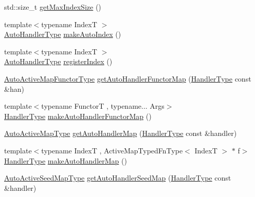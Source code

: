 \begin{DoxyCompactItemize}
\item 
std\+::size\+\_\+t \hyperlink{namespacevt_1_1auto__registry_a590741e9077c758629426d70ea37f4bf}{get\+Max\+Index\+Size} ()
\item 
{\footnotesize template$<$typename IndexT $>$ }\\\hyperlink{namespacevt_1_1auto__registry_ae295e18699146815bb7d7674594d95d7}{Auto\+Handler\+Type} \hyperlink{namespacevt_1_1auto__registry_a14e79eb6744c7f1584d46304356295e2}{make\+Auto\+Index} ()
\item 
{\footnotesize template$<$typename IndexT $>$ }\\\hyperlink{namespacevt_1_1auto__registry_ae295e18699146815bb7d7674594d95d7}{Auto\+Handler\+Type} \hyperlink{namespacevt_1_1auto__registry_a234dcadb35d20ff9a4d0e2464680aa36}{register\+Index} ()
\item 
\hyperlink{namespacevt_1_1auto__registry_ab095554f67e143f84fe337bd85affde5}{Auto\+Active\+Map\+Functor\+Type} \hyperlink{namespacevt_1_1auto__registry_a953643675f2bd525b99c0702753b1367}{get\+Auto\+Handler\+Functor\+Map} (\hyperlink{namespacevt_af64846b57dfcaf104da3ef6967917573}{Handler\+Type} const \&han)
\item 
{\footnotesize template$<$typename FunctorT , typename... Args$>$ }\\\hyperlink{namespacevt_af64846b57dfcaf104da3ef6967917573}{Handler\+Type} \hyperlink{namespacevt_1_1auto__registry_a64989cf40ed8fc5266f9eb67607f4842}{make\+Auto\+Handler\+Functor\+Map} ()
\item 
\hyperlink{namespacevt_1_1auto__registry_a03898a246ff1a8ce8ee4071a0391b386}{Auto\+Active\+Map\+Type} \hyperlink{namespacevt_1_1auto__registry_a5506d0d3d541558f304cc62fbd36c7ce}{get\+Auto\+Handler\+Map} (\hyperlink{namespacevt_af64846b57dfcaf104da3ef6967917573}{Handler\+Type} const \&handler)
\item 
{\footnotesize template$<$typename IndexT , Active\+Map\+Typed\+Fn\+Type$<$ Index\+T $>$ $\ast$ f$>$ }\\\hyperlink{namespacevt_af64846b57dfcaf104da3ef6967917573}{Handler\+Type} \hyperlink{namespacevt_1_1auto__registry_a07288f368e86daba0e0045a8e7bfda92}{make\+Auto\+Handler\+Map} ()
\item 
\hyperlink{namespacevt_1_1auto__registry_a9b5f3bdf0a9a503806cfd4f2747c82f6}{Auto\+Active\+Seed\+Map\+Type} \hyperlink{namespacevt_1_1auto__registry_a9cc26c2d063427e42efb4b08aec5b237}{get\+Auto\+Handler\+Seed\+Map} (\hyperlink{namespacevt_af64846b57dfcaf104da3ef6967917573}{Handler\+Type} const \&handler)
\item 

\end{DoxyCompactItemize}
